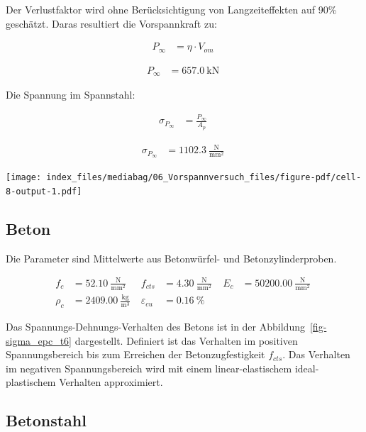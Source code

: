 \documentclass[
  11pt,
  letterpaper,
]{scrreprt}
\begin{document}
Der Verlustfaktor wird ohne Berücksichtigung von Langzeiteffekten auf
90\% geschätzt. Daras resultiert die Vorspannkraft zu:

$$
\begin{aligned}
P_{\infty} &= \eta \cdot V_{om} \; 
\end{aligned}
$$

$$
\begin{aligned}
P_{\infty} &= 657.0\ \mathrm{kN} \;
\end{aligned}
$$

Die Spannung im Spannstahl:

$$
\begin{aligned}
\sigma_{P_{\infty}} &= \frac{ P_{\infty} }{ A_{p} } \; 
\end{aligned}
$$

$$
\begin{aligned}
\sigma_{P_{\infty}} &= 1102.3\ \frac{\mathrm{N}}{\mathrm{mm}^{2}} \;
\end{aligned}
$$

\texttt{[image: index\_files/mediabag/06\_Vorspannversuch\_files/figure-pdf/cell-8-output-1.pdf]}

\subsection{Beton}\label{beton}

Die Parameter sind Mittelwerte aus Betonwürfel- und Betonzylinderproben.

$$
\begin{aligned}
f_{c} &= 52.10\ \frac{\mathrm{N}}{\mathrm{mm}^{2}} \; 
 &f_{cts} &= 4.30\ \frac{\mathrm{N}}{\mathrm{mm}^{2}} \; 
 &E_{c} &= 50200.00\ \frac{\mathrm{N}}{\mathrm{mm}^{2}} \; 
\\[11pt]
 \rho_{c} &= 2409.00\ \frac{\mathrm{kg}}{\mathrm{m}^{3}} \; 
 &\varepsilon_{cu} &= 0.16\ \mathrm{\%} \;
\end{aligned}
$$

Das Spannungs-Dehnungs-Verhalten des Betons ist in der
Abbildung~\ref{fig-sigma_epc_t6} dargestellt. Definiert ist das
Verhalten im positiven Spannungsbereich bis zum Erreichen der
Betonzugfestigkeit \(f_{cts}\). Das Verhalten im negativen
Spannungsbereich wird mit einem linear-elastischem ideal-plastischem
Verhalten approximiert.

\subsection{Betonstahl}\label{betonstahl}
\end{document}
